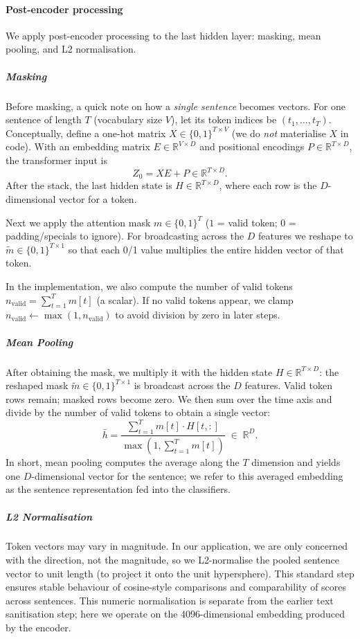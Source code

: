 \documentclass[12pt]{article}
\begin{document}
\paragraph{Post-encoder processing}

We apply post-encoder processing to the last hidden layer: masking, mean pooling, and L2 normalisation.

%
\subparagraph{Masking}
Before masking, a quick note on how a \emph{single sentence} becomes vectors. For one sentence of length $T$ (vocabulary size $V$), let its token indices be $(t_1,\ldots,t_T)$. Conceptually, define a one-hot matrix $X \in \{0,1\}^{T \times V}$ (we do \emph{not} materialise $X$ in code). With an embedding matrix $E \in \mathbb{R}^{V \times D}$ and positional encodings $P \in \mathbb{R}^{T \times D}$, the transformer input is
\[
Z_0 = X E + P \in \mathbb{R}^{T \times D}.
\]
After the stack, the last hidden state is $H \in \mathbb{R}^{T \times D}$, where each row is the $D$-dimensional vector for a token.

Next we apply the attention mask $m \in \{0,1\}^{T}$ ($1$ = valid token; $0$ = padding/specials to ignore). For broadcasting across the $D$ features we reshape to $\tilde{m} \in \{0,1\}^{T \times 1}$ so that each 0/1 value multiplies the entire hidden vector of that token.

In the implementation, we also compute the number of valid tokens $n_{\mathrm{valid}} = \sum_{t=1}^{T} m[t]$ (a scalar). If no valid tokens appear, we clamp $n_{\mathrm{valid}} \leftarrow \max(1, n_{\mathrm{valid}})$ to avoid division by zero in later steps.

%
\subparagraph{Mean Pooling}
After obtaining the mask, we multiply it with the hidden state $H \in \mathbb{R}^{T \times D}$:
the reshaped mask $\tilde{m} \in \{0,1\}^{T \times 1}$ is broadcast across the $D$ features. Valid token rows remain; masked rows become zero. We then sum over the time axis and divide by the number of valid tokens to obtain a single vector:
\begin{equation}
\bar{h}
= \frac{\displaystyle \sum_{t=1}^{T} m[t] \cdot H[t,:]}
{\displaystyle \max\!\left(1, \sum_{t=1}^{T} m[t]\right)}
\;\in\; \mathbb{R}^{D}.
\end{equation}
In short, mean pooling computes the average along the $T$ dimension and yields one $D$-dimensional vector for the sentence; we refer to this averaged embedding as the sentence representation fed into the classifiers.

%
\subparagraph{L2 Normalisation}
Token vectors may vary in magnitude. In our application, we are only concerned with the direction, not the magnitude, so we L2-normalise the pooled sentence vector to unit length (to project it onto the unit hypersphere). This standard step ensures stable behaviour of cosine-style comparisons and comparability of scores across sentences. This numeric normalisation is separate from the earlier text sanitisation step; here we operate on the 4096-dimensional embedding produced by the encoder.
\end{document}
